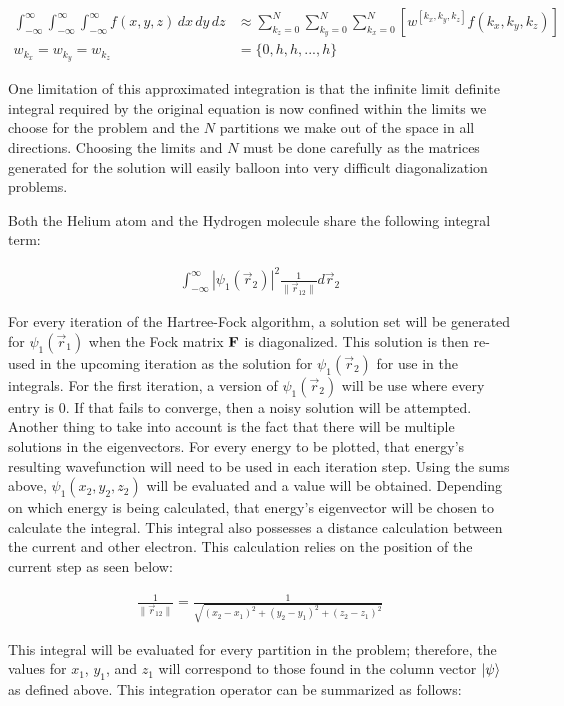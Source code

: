 \documentclass[10pt, oneside, letterpaper]{article}
\begin{document}
\begin{align*}
  \int_{-\infty}^{\infty}\int_{-\infty}^{\infty}\int_{-\infty}^{\infty}f(x,y,z)\,dx\,dy\,dz &\approx \sum_{k_z=0}^N\sum_{k_y=0}^N\sum_{k_x=0}^N \left[w^{[k_x, k_y, k_z]}f(k_x, k_y, k_z)\right] \\
  w_{k_x} = w_{k_y} = w_{k_z} &= \{0, h, h, ..., h\}
\end{align*}

One limitation of this approximated integration is that the infinite limit definite integral required by the original equation is now confined within the limits we choose for the problem and the $N$ partitions we make out of the space in all directions. Choosing the limits and $N$ must be done carefully as the matrices generated for the solution will easily balloon into very difficult diagonalization problems.

Both the Helium atom and the Hydrogen molecule share the following integral term:

\begin{align*}
  \int_{-\infty}^{\infty}\left|\psi_1(\vec{r}_2)\right|^2\frac{1}{\|\vec{r}_{12}\|}d\vec{r}_2
\end{align*}

For every iteration of the Hartree-Fock algorithm, a solution set will be generated for $\psi_1(\vec{r}_1)$ when the Fock matrix $\bf{F}$ is diagonalized. This solution is then re-used in the upcoming iteration as the solution for $\psi_1(\vec{r}_2)$ for use in the integrals. For the first iteration, a version of $\psi_1(\vec{r}_2)$ will be use where every entry is 0. If that fails to converge, then a noisy solution will be attempted. Another thing to take into account is the fact that there will be multiple solutions in the eigenvectors. For every energy to be plotted, that energy's resulting wavefunction will need to be used in each iteration step. Using the sums above, $\psi_1(x_2, y_2, z_2)$ will be evaluated and a value will be obtained. Depending on which energy is being calculated, that energy's eigenvector will be chosen to calculate the integral. This integral also possesses a distance calculation between the current and other electron. This calculation relies on the position of the current step as seen below:

\begin{align*}
  \frac{1}{\|\vec{r}_{12}\|} = \frac{1}{\sqrt{(x_2-x_1)^2 + (y_2-y_1)^2 + (z_2-z_1)^2}}
\end{align*}

This integral will be evaluated for every partition in the problem; therefore, the values for $x_1$, $y_1$, and $z_1$ will correspond to those found in the column vector $\ket{\psi}$ as defined above. This integration operator can be summarized as follows:
\end{document}
